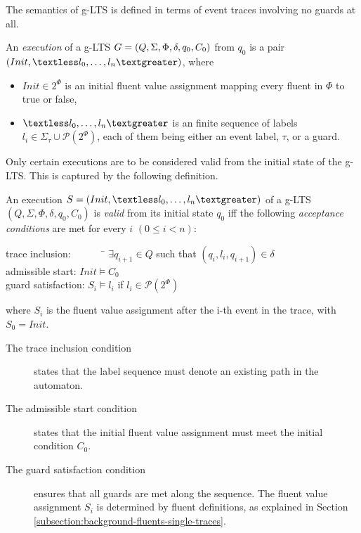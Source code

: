 The semantics of g-LTS is defined in terms of event traces involving no guards at all.

\begin{definition}
An \emph{execution} of a g-LTS $G = (Q,\Sigma,\Phi,\\\delta,q_{0},C_{0})$ from $q_0$ is a pair $(Init, \textless l_0, \ldots,l_n\textgreater)$, where 
\begin{itemize}
\item $Init \in 2^\Phi$ is an initial fluent value assignment mapping every fluent in $\Phi$ to true or false,
\item $\textless l_0,\ldots,l_n \textgreater$ is an finite sequence of labels $l_i \in \Sigma_{\tau}\cup\mathcal{P}(2^\Phi)$, each of them being either an event label, $\tau$, or a guard.
\end{itemize}
\end{definition}

Only certain executions are to be considered valid from the initial state of the g-LTS. This is captured by the following definition.

\begin{definition}
An execution $S = (Init,\textless l_0,\ldots,l_n\textgreater)$ of a g-LTS $(Q,\Sigma,\Phi,\delta,q_{0},C_{0})$ is \emph{valid} from its initial state $q_0$ iff the following \emph{acceptance conditions} are met for every $i$ $(0 \leqslant i < n)$:\\
\vspace{-0.8cm}
\begin{tabbing}
\indent trace inclusion:~~~~~~~\= $\exists q_{i+1} \in Q$ such that $(q_i,l_i,q_{i+1}) \in \delta$\\
\indent admissible start:      \> $Init \models C_0$ \\
\indent guard satisfaction:    \> $S_i \models l_i$ if $l_i \in \mathcal{P}(2^\Phi)$\\
\end{tabbing}
\vspace{-0.8cm}
where $S_i$ is the fluent value assignment after the i-th event in the trace, with $S_0 = Init$.
\end{definition}

\begin{description}
\item[The trace inclusion condition] states that the label sequence must denote an existing path in the automaton.
\item[The admissible start condition] states that the initial fluent value assignment must meet the initial condition $C_0$.
\item[The guard satisfaction condition] ensures that all guards are met along the sequence. The fluent value assignment $S_i$ is determined by fluent definitions, as explained in Section \ref{subsection:background-fluents-single-traces}. 
\end{description}

